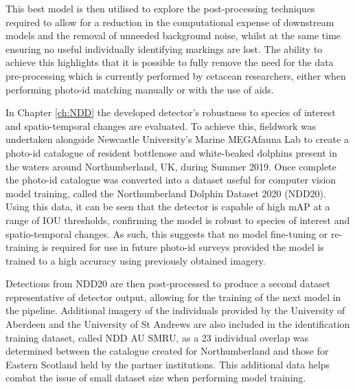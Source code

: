 This best model is then utilised to explore the post-processing techniques required to allow for a reduction in the computational expense of downstream models and the removal of unneeded background noise, whilst at the same time ensuring no useful individually identifying markings are lost. The ability to achieve this highlights that it is possible to fully remove the need for the data pre-processing which is currently performed by cetacean researchers, either when performing photo-id matching manually or with the use of aids.

In Chapter \ref{ch:NDD} the developed detector's robustness to species of interest and spatio-temporal changes are evaluated. To achieve this, fieldwork was undertaken alongside Newcastle University's Marine MEGAfauna Lab to create a photo-id catalogue of resident bottlenose and white-beaked dolphins present in the waters around Northumberland, UK, during Summer 2019. Once complete the photo-id catalogue was converted into a dataset useful for computer vision model training, called the Northumberland Dolphin Dataset 2020 (NDD20). Using this data, it can be seen that the detector is capable of high mAP at a range of IOU thresholds, confirming the model is robust to species of interest and spatio-temporal changes. As such, this suggests that no model fine-tuning or re-training is required for use in future photo-id surveys provided the model is trained to a high accuracy using previously obtained imagery. 

Detections from NDD20 are then post-processed to produce a second dataset representative of detector output, allowing for the training of the next model in the pipeline. Additional imagery of the individuals provided by the University of Aberdeen and the University of St Andrews are also included in the identification training dataset, called NDD AU SMRU, as a 23 individual overlap was determined between the catalogue created for Northumberland and those for Eastern Scotland held by the partner institutions. This additional data helps combat the issue of small dataset size when performing model training. 

